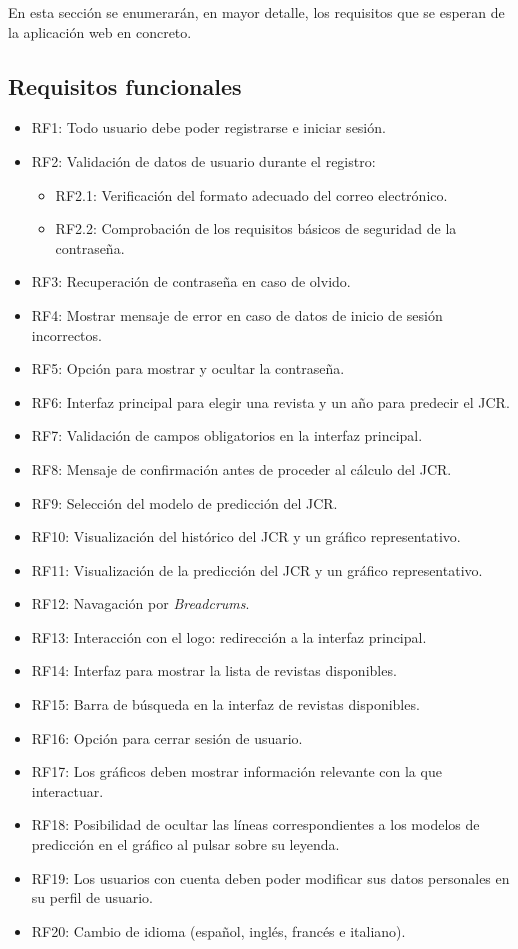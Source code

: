En esta sección se enumerarán, en mayor detalle, los requisitos que se esperan de la aplicación web en concreto.

\subsection{Requisitos funcionales}

\begin{itemize}
    \item RF1: Todo usuario debe poder registrarse e iniciar sesión.
    \item RF2: Validación de datos de usuario durante el registro:
    \begin{itemize}
        \item RF2.1: Verificación del formato adecuado del correo electrónico.
        \item RF2.2: Comprobación de los requisitos básicos de seguridad de la contraseña.
    \end{itemize}
    \item RF3: Recuperación de contraseña en caso de olvido.
    \item RF4: Mostrar mensaje de error en caso de datos de inicio de sesión incorrectos.
    \item RF5: Opción para mostrar y ocultar la contraseña.
    \item RF6: Interfaz principal para elegir una revista y un año para predecir el JCR.
    \item RF7: Validación de campos obligatorios en la interfaz principal.
    \item RF8: Mensaje de confirmación antes de proceder al cálculo del JCR.
    \item RF9: Selección del modelo de predicción del JCR.
    \item RF10: Visualización del histórico del JCR y un gráfico representativo.
    \item RF11: Visualización de la predicción del JCR y un gráfico representativo.
    \item RF12: Navagación por \textit{Breadcrums}.
    \item RF13: Interacción con el logo: redirección a la interfaz principal.
    \item RF14: Interfaz para mostrar la lista de revistas disponibles.
    \item RF15: Barra de búsqueda en la interfaz de revistas disponibles.
    \item RF16: Opción para cerrar sesión de usuario.
    \item RF17: Los gráficos deben mostrar información relevante con la que interactuar.
    \item RF18: Posibilidad de ocultar las líneas correspondientes a los modelos de predicción en el gráfico al pulsar sobre su leyenda.
    \item RF19: Los usuarios con cuenta deben poder modificar sus datos personales en su perfil de usuario.
    \item RF20: Cambio de idioma (español, inglés, francés e italiano).
\end{itemize}

